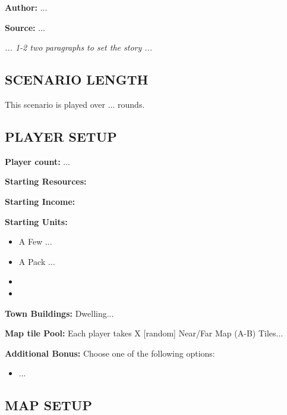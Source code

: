 
\begin{multicols*}{2}

\textbf{Author:} ...

\textbf{Source:} ...

\textit{... 1-2 two paragraphs to set the story ...}

\subsection*{\MakeUppercase{Scenario Length}}

This scenario is played over ... rounds.

\subsection*{\MakeUppercase{Player Setup}}

\textbf{Player count:} ...

\textbf{Starting Resources:}\par
{}

\textbf{Starting Income:}\par
{}

\textbf{Starting Units:}
\begin{itemize}
  \item A Few ...
  \item A Pack ...
  \item {}
  \item {}
\end{itemize}

\textbf{Town Buildings:}  Dwelling...

\textbf{Map tile Pool:} Each player takes X [random] Near/Far Map (A-B) Tiles...

\textbf{Additional Bonus:} Choose one of the following options:

\begin{itemize}
    \item ...
\end{itemize}

\subsection*{\MakeUppercase{Map setup}}


\end{multicols*}
